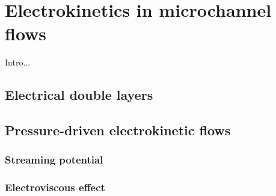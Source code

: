 \chapter{Electrokinetics in microchannel flows}
Intro...

\section{Electrical double layers}

\section{Pressure-driven electrokinetic flows}

\subsection{Streaming potential}

\subsection{Electroviscous effect}


